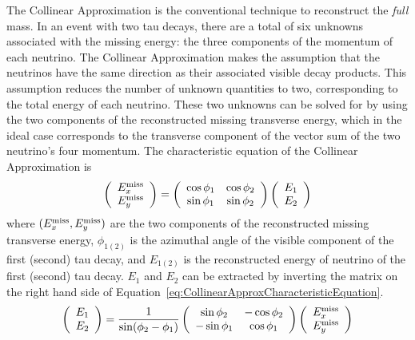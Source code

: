 The Collinear Approximation is the conventional technique to reconstruct the
\emph{full} \TT mass.  In an event with two tau decays, there are a total of six
unknowns associated with the missing energy: the three components of the
momentum of each neutrino.  The Collinear Approximation makes the assumption
that the neutrinos have the same direction as their associated visible decay
products.  This assumption reduces the number of unknown quantities to two,
corresponding to the total energy of each neutrino.  These two unknowns can be
solved for by using the two components of the reconstructed missing transverse
energy, which in the ideal case corresponds to the transverse component of the
vector sum of the two neutrino's four momentum.  The characteristic equation of
the Collinear Approximation is 
\begin{equation}
  \left( \begin{array}{c} E_{x}^{\text{miss}} \\ E_{y}^{\text{miss}} \end{array} \right) = 
    \left( \begin{array}{cc} 
      \cos\phi_1 & \cos\phi_2 \\
      \sin\phi_1 & \sin\phi_2 
    \end{array} \right) 
    \left(\begin{array}{c} E_1 \\ E_2 \end{array} \right)
      \label{eq:CollinearApproxCharacteristicEquation}
\end{equation}
where $(E_{x}^{\text{miss}}, E_{y}^{\text{miss}})$ are the two components of the reconstructed missing
transverse energy, $\phi_{1(2)}$ is the azimuthal angle of the visible component
of the first (second) tau decay, and $E_{1(2)}$ is the reconstructed energy of
neutrino of the first (second) tau decay.  $E_1$ and $E_2$ can be extracted by
inverting the matrix on the right hand side of
Equation~\ref{eq:CollinearApproxCharacteristicEquation}.
\begin{equation}
  \left(\begin{array}{c} E_1 \\ E_2 \end{array} \right) = 
    \frac{1}{\sin(\phi_2 - \phi_1)} 
    \left( \begin{array}{cc} 
      \sin\phi_2 & -\cos\phi_2 \\
      -\sin\phi_1 & \cos\phi_1 
    \end{array} \right) 
  \left( \begin{array}{c} E_{x}^{\text{miss}} \\ E_{y}^{\text{miss}} \end{array} \right) 
    \label{eq:CollinearApproxInvertedEquation} 
\end{equation}

